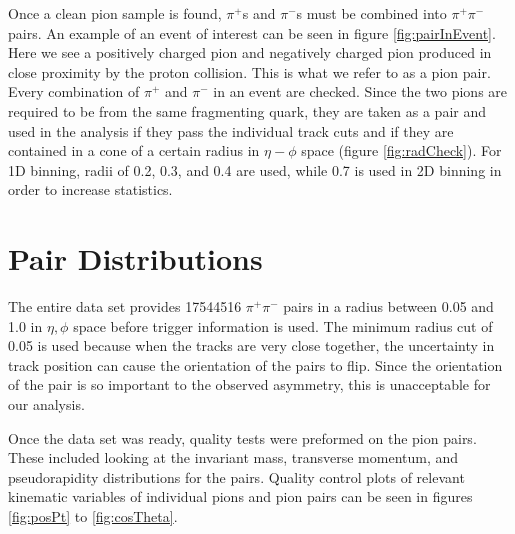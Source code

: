 \documentclass[abstract = on,listof=totoc, bibliography=totoc]{scrreprt}
\begin{document}

Once a clean pion sample is found, $\pi^+$s and $\pi^-$s must be combined into $\pi^+\pi^-$ pairs. An example of an event of interest can be seen in figure \ref{fig:pairInEvent}. Here we see a positively charged pion and negatively charged pion produced in close proximity by the proton collision. This is what we refer to as a pion pair.  Every combination of $\pi^+$ and $\pi^-$ in an event are checked. Since the two pions are required to be from the same fragmenting quark, they are taken as a pair and used in the analysis if they pass the individual track cuts and if they are contained in a cone of a certain radius in $\eta-\phi$ space (figure \ref{fig:radCheck}). For 1D binning, radii of 0.2, 0.3, and 0.4 are used, while 0.7 is used in 2D binning in order to increase statistics.  


\FloatBarrier
\section{Pair Distributions}

The entire data set provides 17544516 $\pi^+\pi^-$ pairs in a radius between 0.05 and 1.0 in $\eta,\phi$ space before trigger information is used. The minimum radius cut of 0.05 is used because when the tracks are very close together, the uncertainty in track position can cause the orientation of the pairs to flip. Since the orientation of the pair is so important to the observed asymmetry, this is unacceptable for our analysis. 


Once the data set was ready, quality tests were preformed on the pion pairs. These included looking at the invariant mass, transverse momentum, and pseudorapidity distributions for the pairs. Quality control plots of relevant kinematic variables of individual pions and pion pairs can be seen in figures \ref{fig:posPt} to \ref{fig:cosTheta}. 
\end{document}
